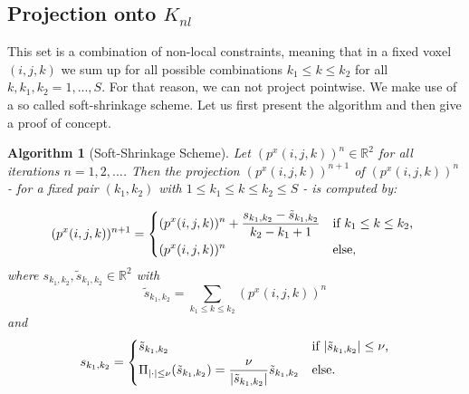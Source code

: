 \documentclass{scrreprt}
\newtheorem{algorithm}[theorem]{Algorithm}
\begin{document}
        \subsection{Projection onto $K_{nl}$}

            This set is a combination of non-local constraints, meaning that in a fixed voxel $(i, j, k)$ we sum up for all possible combinations $k_{1} \le k \le k_{2}$ for all $k, k_{1}, k_{2} = 1, ..., S$. For that reason, we can not project pointwise. We make use of a so called soft-shrinkage scheme. Let us first present the algorithm and then give a proof of concept.

            \begin{algorithm}[Soft-Shrinkage Scheme]
            \label{alg:softshrinkage}
                Let $(p^{x}(i,j,k))^{n} \in \mathbb{R}^{2}$ for all iterations $n = 1, 2, ...$. Then the projection $(p^{x}(i,j,k))^{n+1}$ of $(p^{x}(i,j,k))^{n}$ - for a fixed pair $(k_{1}, k_{2})$ with $1 \le k_{1} \le k \le k_{2} \le S$ - is computed by:

                    \[
                        (p^{x}(i,j,k))^{n+1} =
                            \begin{dcases*}
                                (p^{x}(i,j,k))^{n} + \frac{s_{k_{1}, k_{2}} - \tilde{s}_{k_{1}, k_{2}}}{k_{2} - k_{1} + 1} & \textnormal{if $k_{1} \le k \le k_{2}$}, \\
                                (p^{x}(i,j,k))^{n} & \textnormal{else},
                            \end{dcases*}
                    \]
                where $s_{k_{1}, k_{2}}, \tilde{s}_{k_{1}, k_{2}} \in \mathbb{R}^{2}$ with
                    $$
                        \tilde{s}_{k_{1}, k_{2}} = \sum_{k_{1} \le k \le k_{2}} (p^{x}(i,j,k))^{n}
                    $$
                and
                    \[
                        s_{k_{1}, k_{2}} =
                            \begin{dcases*}
                                \tilde{s}_{k_{1}, k_{2}} & \textnormal{if $|\tilde{s}_{k_{1}, k_{2}}| \le \nu$},\\
                                \Pi_{|\cdot| \le \nu}(\tilde{s}_{k_{1}, k_{2}}) = \frac{\nu}{|\tilde{s}_{k_{1}, k_{2}}|} \tilde{s}_{k_{1}, k_{2}} & \textnormal{else}.
                            \end{dcases*}
                    \]
            \end{algorithm}
\end{document}
